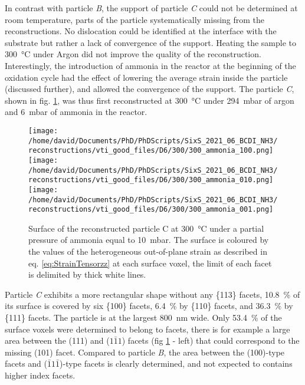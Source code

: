 In contrast with particle \textit{B}, the support of particle \textit{C} could not be determined at room temperature, parts of the particle systematically missing from the reconstructions.
No dislocation could be identified at the interface with the substrate but rather a lack of convergence of the support.
Heating the sample to \qty{300}{\degreeCelsius} under Argon did not improve the quality of the reconstruction.
Interestingly, the introduction of ammonia in the reactor at the beginning of the oxidation cycle had the effect of lowering the average strain inside the particle (discussed further), and allowed the convergence of the support.
The particle \textit{C}, shown in fig. \ref{fig:D6Facets}, was thus first reconstructed at \qty{300}{\degreeCelsius} under \qty{294}{\milli\bar} of argon and \qty{6}{\milli\bar} of ammonia in the reactor.

\begin{figure}[!htb]
    \centering
    \texttt{[image: /home/david/Documents/PhD/PhDScripts/SixS\_2021\_06\_BCDI\_NH3/reconstructions/vti\_good\_files/D6/300/300\_ammonia\_100.png]}
    \texttt{[image: /home/david/Documents/PhD/PhDScripts/SixS\_2021\_06\_BCDI\_NH3/reconstructions/vti\_good\_files/D6/300/300\_ammonia\_010.png]}
    \texttt{[image: /home/david/Documents/PhD/PhDScripts/SixS\_2021\_06\_BCDI\_NH3/reconstructions/vti\_good\_files/D6/300/300\_ammonia\_001.png]}
    \caption{
        Surface of the reconstructed particle C at \qty{300}{\degreeCelsius} under a partial pressure of ammonia equal to \qty{10}{\milli\bar}.
        The surface is coloured by the values of the heterogeneous out-of-plane strain as described in eq. \ref{eq:StrainTensorzz} at each surface voxel, the limit of each facet is delimited by thick white lines.
    }
    \label{fig:D6Facets}
\end{figure}

Particle \textit{C} exhibits a more rectangular shape without any \{113\} facets, \qty{10.8}{\percent} of its surface is covered by six \{100\} facets, \qty{6.4}{\percent} by \{110\} facets, and \qty{36.3}{\percent} by \{111\} facets.
The particle is at the largest \qty{800}{\nm} wide.
Only \qty{53.4}{\percent} of the surface voxels were determined to belong to facets, there is for example a large area between the (111) and ($1\bar{1}1$) facets (fig \ref{fig:D6Facets} - left) that could correspond to the missing (101) facet.
Compared to particle \textit{B}, the area between the (100)-type facets and ($\bar{1}1\bar{1}$)-type facets is clearly determined, and not expected to contains higher index facets.

